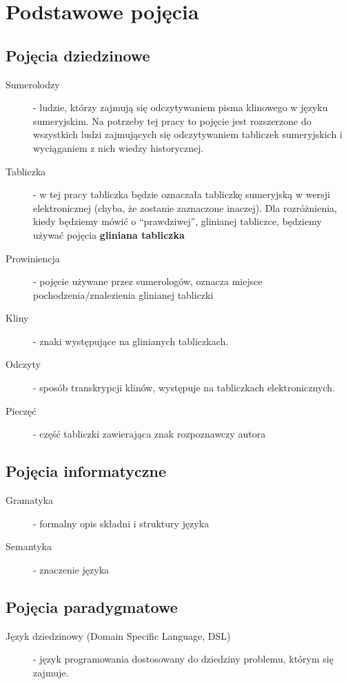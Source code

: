 \chapter{Podstawowe pojęcia}\label{r:pojecia}
\section{Pojęcia dziedzinowe}
\begin{description}
 \item[Sumerolodzy] - ludzie, którzy zajmują się odczytywaniem pisma klinowego w języku sumeryjskim. Na potrzeby tej pracy
		      to pojęcie jest rozszerzone do wszystkich ludzi zajmujących się odczytywaniem tabliczek sumeryjskich 
		      i wyciąganiem z nich wiedzy historycznej.
 \item[Tabliczka] - w tej pracy tabliczka będzie oznaczała tabliczkę sumeryjską w wersji elektronicznej 
		  (chyba, że zostanie zaznaczone inaczej). Dla rozróżnienia, kiedy będziemy mówić o ``prawdziwej'', 
		  glinianej tabliczce, będziemy używać pojęcia \textbf{gliniana tabliczka}
 \item[Prowiniencja] - pojęcie używane przez sumerologów, oznacza miejsce pochodzenia/znalezienia glinianej tabliczki
 \item[Kliny] - znaki występujące na glinianych tabliczkach.
 \item[Odczyty] - sposób transkrypcji klinów, występuje na tabliczkach elektronicznych.
 \item[Pieczęć] - część tabliczki zawierająca znak rozpoznawczy autora
\end{description}

\section{Pojęcia informatyczne}
\begin{description}
 \item[Gramatyka] - formalny opis składni i struktury języka
 \item[Semantyka] - znaczenie języka
 \end{description}
\section{Pojęcia paradygmatowe}
\begin{description}
 \item[Język dziedzinowy (Domain Specific Language, DSL)] - język programowania dostosowany do dziedziny problemu, którym się zajmuje. 
 \end{description}